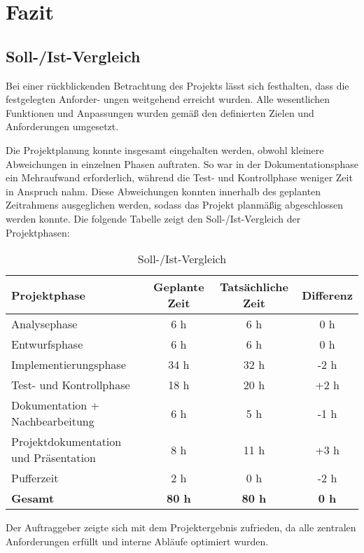 \section{Fazit} 
\label{sec:Fazit}

\subsection{Soll-/Ist-Vergleich}
\label{sec:SollIstVergleich}

Bei einer rückblickenden Betrachtung des Projekts lässt sich festhalten, dass die festgelegten Anforder-
ungen weitgehend erreicht wurden. Alle wesentlichen Funktionen und Anpassungen wurden gemäß den definierten Zielen und Anforderungen umgesetzt.

Die Projektplanung konnte insgesamt eingehalten werden, obwohl kleinere Abweichungen in einzelnen Phasen auftraten. So war in der Dokumentationsphase ein Mehraufwand erforderlich, während die Test- und Kontrollphase weniger Zeit in Anspruch nahm. Diese Abweichungen konnten innerhalb des geplanten Zeitrahmens ausgeglichen werden, sodass das Projekt planmäßig abgeschlossen werden konnte. Die folgende Tabelle zeigt den Soll-/Ist-Vergleich der Projektphasen:

\begin{table}[h]
\centering
\caption{Soll-/Ist-Vergleich}
\label{tab:Vergleich}
\begin{tabular}{|l|c|c|c|}
\hline
\textbf{Projektphase} & \textbf{Geplante Zeit} & \textbf{Tatsächliche Zeit} & \textbf{Differenz} \\
\hline
Analysephase & 6 h & 6 h & 0 h \\
\hline
Entwurfsphase & 6 h & 6 h & 0 h \\
\hline
Implementierungsphase & 34 h & 32 h & -2 h \\
\hline
Test- und Kontrollphase & 18 h & 20 h & +2 h \\
\hline
Dokumentation + Nachbearbeitung & 6 h & 5 h & -1 h \\
\hline
Projektdokumentation und Präsentation & 8 h & 11 h & +3 h \\
\hline
Pufferzeit & 2 h & 0 h & -2 h \\
\hline
\textbf{Gesamt} & \textbf{80 h} & \textbf{80 h} & \textbf{0 h} \\
\hline
\end{tabular}
\end{table}

Der Auftraggeber zeigte sich mit dem Projektergebnis zufrieden, da alle zentralen Anforderungen erfüllt und interne Abläufe optimiert wurden.

